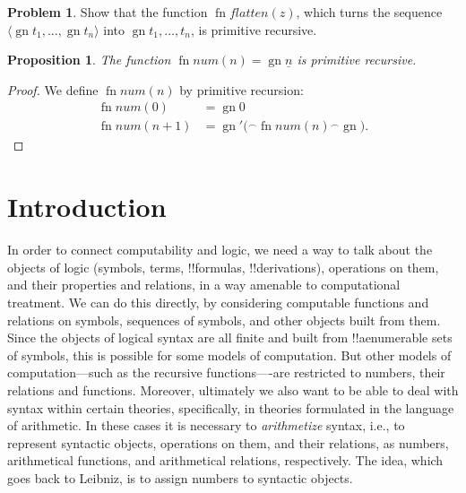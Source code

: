 \documentclass[10pt,a4paper]{article}
\theoremstyle{plain}
\newtheorem{prop}[thm]{Proposition}
\theoremstyle{definition}
\newtheorem{prob}{Problem}[section]
\theoremstyle{remark}
\newcommand*{\olfileid}[3]{}
\newcommand*{\olsection}[1]{\section*{#1}}
\newcommand*{\ollabel}[1]{\label{#1}}
\providecommand{\Obj}{}
\providecommand{\tuple}[1]{\langle #1 \rangle}
\providecommand{\num}[1]{\underline{#1}}
\providecommand{\concat}{\mathbin{{}^\frown}}
\providecommand{\Gn}{\operatorname{gn}}
\providecommand{\fn}{\operatorname{fn}}
\begin{document}
\begin{prob}
Show that the function $\fn{flatten}(z)$, which turns the sequence
$\tuple{\Gn{t_1}, \dots, \Gn{t_n}}$ into $\Gn{t_1, \dots, t_n}$, is
primitive recursive.
\end{prob}

\begin{prop}\ollabel{prop:num-primrec}
  The function $\fn{num}(n) = \Gn{\num{n}}$ is primitive recursive.
\end{prop}

\begin{proof}
  We define $\fn{num}(n)$ by primitive recursion:
  \begin{align*}
    \fn{num}(0) & = \Gn{\Obj 0}\\
    \fn{num}(n+1) & = \Gn{\prime(} \concat \fn{num}(n) \concat \Gn{)}.
  \end{align*}
\end{proof}





\olfileid{inc}{art}{int}
\olsection{Introduction}

In order to connect computability and logic, we need a way to talk
about the objects of logic (symbols, terms, !!{formula}s,
!!{derivation}s), operations on them, and their properties and
relations, in a way amenable to computational treatment.  We can do
this directly, by considering computable functions and relations on
symbols, sequences of symbols, and other objects built from them.
Since the objects of logical syntax are all finite and built from
!!a{enumerable} sets of symbols, this is possible for some models of
computation.  But other models of computation---such as the recursive
functions----are restricted to numbers, their relations and functions.
Moreover, ultimately we also want to be able to deal with syntax
within certain theories, specifically, in theories formulated in the
language of arithmetic.  In these cases it is necessary to
\emph{arithmetize} syntax, i.e., to represent syntactic objects,
operations on them, and their relations, as numbers, arithmetical
functions, and arithmetical relations, respectively. The idea, which
goes back to Leibniz, is to assign numbers to syntactic objects.
\end{document}
